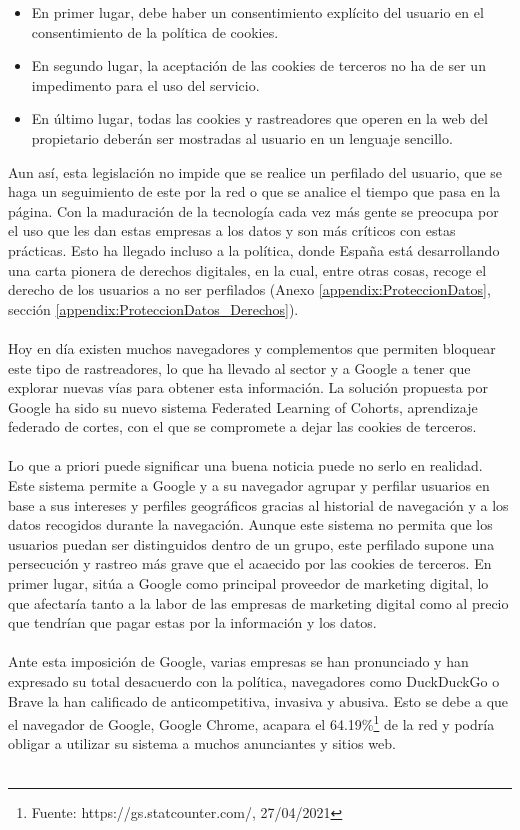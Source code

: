 \begin{itemize}
    \item En primer lugar, debe haber un consentimiento explícito del usuario en el consentimiento de la política de cookies. 
    \item En segundo lugar, la aceptación de las cookies de terceros no ha de ser un impedimento para el uso del servicio.
    \item En último lugar, todas las cookies y rastreadores que operen en la web del propietario deberán ser mostradas al usuario en un lenguaje sencillo.
\end{itemize} 
Aun así, esta legislación no impide que se realice un perfilado del usuario, que se haga un seguimiento de este por la red o que se analice el tiempo que pasa en la página. Con la maduración de la tecnología cada vez más gente se preocupa por el uso que les dan estas empresas a los datos y son más críticos con estas prácticas. Esto ha llegado incluso a la política, donde España está desarrollando una carta pionera de derechos digitales, en la cual, entre otras cosas, recoge el derecho de los usuarios a no ser perfilados (Anexo \ref{appendix:ProteccionDatos}, sección \ref{appendix:ProteccionDatos_Derechos}).
\\ \\
Hoy en día existen muchos navegadores y complementos que permiten bloquear este tipo de rastreadores, lo que ha llevado al sector y a Google a tener que explorar nuevas vías para obtener esta información. La solución propuesta por Google ha sido su nuevo sistema Federated Learning of Cohorts, aprendizaje federado de cortes, con el que se compromete a dejar las cookies de terceros.
\\ \\
Lo que a priori puede significar una buena noticia puede no serlo en realidad. Este sistema permite a Google y a su navegador agrupar y perfilar usuarios en base a sus intereses y perfiles geográficos gracias al historial de navegación y a los datos recogidos durante la navegación. Aunque este sistema no permita que los usuarios puedan ser distinguidos dentro de un grupo, este perfilado supone una persecución y rastreo más grave que el acaecido por las cookies de terceros. En primer lugar, sitúa a Google como principal proveedor de marketing digital, lo que afectaría tanto a la labor de las empresas de marketing digital como al precio que tendrían que pagar estas por la información y los datos.
\\ \\
Ante esta imposición de Google, varias empresas se han pronunciado y han expresado su total desacuerdo con la política, navegadores como DuckDuckGo o Brave la han calificado de anticompetitiva, invasiva y abusiva. Esto se debe a que el navegador de Google, Google Chrome, acapara el 64.19\%\footnote{Fuente: https://gs.statcounter.com/, 27/04/2021} de la red y podría obligar a utilizar su sistema a muchos anunciantes y sitios web.
\\ \\  
